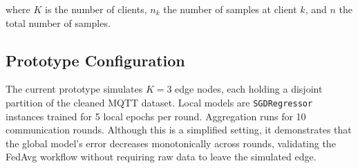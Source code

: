 where $K$ is the number of clients, $n_k$ the number of samples at client $k$, and $n$ the total number of samples.

\subsection{Prototype Configuration}

The current prototype simulates $K=3$ edge nodes, each holding a disjoint partition of the cleaned MQTT dataset. Local models are \texttt{SGDRegressor} instances trained for 5 local epochs per round. Aggregation runs for 10 communication rounds. Although this is a simplified setting, it demonstrates that the global model's error decreases monotonically across rounds, validating the FedAvg workflow without requiring raw data to leave the simulated edge.
